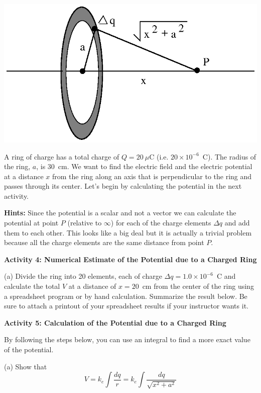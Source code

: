 \vspace{0.3cm}
{\centering \includegraphics[scale=0.8]{electric_potential/electric_potential_fig_5.eps} \par}
\vspace{0.3cm}

\vspace{2in}
A ring of charge has a total charge of $Q = 20\ \mu$C (i.e. $20
\times 10^{-6}$~C). The radius of the ring, $a$, is 30~cm. We want
to find the electric field and the electric potential at a distance $x$ from the ring along an axis that is perpendicular to the ring
and passes through its center. Let's begin by calculating the potential
in the next activity.

\textbf{Hints:} Since the potential is a scalar and not a vector we
can calculate the potential at point $P$ (relative to $\infty$)
for each of the charge elements $\Delta q$ and add them to each
other. This looks like a big deal but it is actually a trivial problem
because all the charge elements are the same distance from point $P$.

\textbf{Activity 4: Numerical Estimate of the Potential due to a Charged
Ring}

(a) Divide the ring into 20 elements, each of charge $\Delta q = 1.0 \times 10^{-6}$~C and
calculate the total $V$ at a distance of $x = 20$~cm from the center of
the ring using a spreadsheet program or by hand calculation. Summarize
the result below. Be sure to attach a printout of your spreadsheet
results if your instructor wants it.
\answerspace{1.25in}

\textbf{Activity 5: Calculation of the Potential due to a Charged Ring}

By following the steps below, you can use an integral to find a more
exact value of the potential.

(a) Show that 
\begin{displaymath}
V=k_e\int \frac{dq}{r}=k_e\int \frac{dq}{\sqrt{x^{2}+a^{2}}}
\end{displaymath}
\answerspace{20mm}


